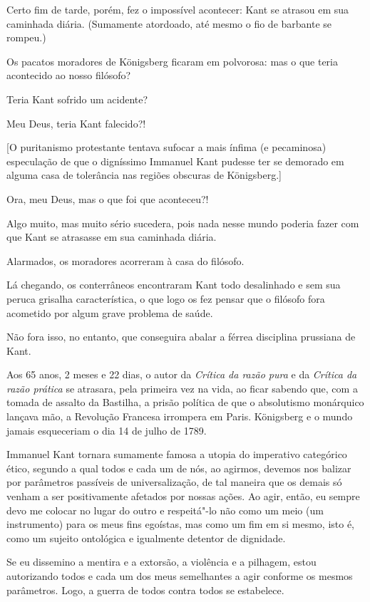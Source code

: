 Certo fim de tarde, porém, fez o impossível acontecer: Kant se atrasou
em sua caminhada diária. (Sumamente atordoado, até mesmo o fio de
barbante se rompeu.)

Os pacatos moradores de Königsberg ficaram em polvorosa: mas o que teria
acontecido ao nosso filósofo?

Teria Kant sofrido um acidente?

Meu Deus, teria Kant falecido?!

{[}O puritanismo protestante tentava sufocar a mais ínfima (e
pecaminosa) especulação de que o digníssimo Immanuel Kant pudesse ter se
demorado em alguma casa de tolerância nas regiões obscuras de
Königsberg.{]}

Ora, meu Deus, mas o que foi que aconteceu?!

Algo muito, mas muito sério sucedera, pois nada nesse mundo poderia
fazer com que Kant se atrasasse em sua caminhada diária.

Alarmados, os moradores acorreram à casa do filósofo.

Lá chegando, os conterrâneos encontraram Kant todo desalinhado e sem sua
peruca grisalha característica, o que logo os fez pensar que o filósofo
fora acometido por algum grave problema de saúde.

Não fora isso, no entanto, que conseguira abalar a férrea disciplina
prussiana de Kant.

Aos 65 anos, 2 meses e 22 dias, o autor da \emph{Crítica da razão pura}
e da \emph{Crítica da razão prática} se atrasara, pela primeira vez na
vida, ao ficar sabendo que, com a tomada de assalto da Bastilha, a
prisão política de que o absolutismo monárquico lançava mão, a Revolução
Francesa irrompera em Paris. Königsberg e o mundo jamais esqueceriam o
dia 14 de julho de 1789.

Immanuel Kant tornara sumamente famosa a utopia do imperativo categórico
ético, segundo a qual todos e cada um de nós, ao agirmos, devemos nos
balizar por parâmetros passíveis de universalização, de tal maneira que
os demais só venham a ser positivamente afetados por nossas ações. Ao
agir, então, eu sempre devo me colocar no lugar do outro e respeitá"-lo
não como um meio (um instrumento) para os meus fins egoístas, mas como
um fim em si mesmo, isto é, como um sujeito ontológica e igualmente
detentor de dignidade.

Se eu dissemino a mentira e a extorsão, a violência e a pilhagem, estou
autorizando todos e cada um dos meus semelhantes a agir conforme os
mesmos parâmetros. Logo, a guerra de todos contra todos se estabelece.

